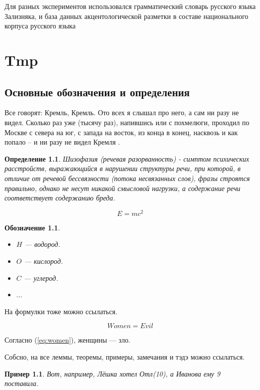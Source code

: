 \documentclass[14pt, a4paper, russian]{report}
\newtheorem{definition}{\indent Определение}
\newtheorem{example}{\indent Пример}
\newtheorem{notation}{\indent Обозначение}
\begin{document}
\begin{normalsize}
Для разных экспериментов использовался грамматический словарь русского языка Зализняка,\cite{zaliz} и база данных акцентологической разметки в составе национального корпуса русского языка\cite{grishina} 





\newpage
\chapter{Tmp}
\section{Основные обозначения и определения}

Все говорят: Кремль, Кремль. Ото всех я слышал про него, а сам ни разу не видел. Сколько раз уже (тысячу раз), напившись или с похмелюги, проходил по Москве с севера на юг, с запада на восток, из конца в конец, насквозь и как попало – и ни разу не видел Кремля \cite{erofeev}.

\begin{definition}\label{def:schizo}
Шизофазия (речевая разорванность) - симптом психических расстройств, выражающийся в нарушении структуры речи, при которой, в отличие от речевой бессвязности (потока несвязанных слов), фразы строятся правильно, однако не несут никакой смысловой нагрузки, а содержание речи соответствует содержанию бреда.\cite{schizo}
\end{definition}
$$E = m c^2$$

\begin{notation} 
\begin{itemize}
\item $H$ --- водород.
\item $O$ --- кислород.
\item $C$ --- углерод.
\item $\ldots$
\end{itemize}
\end{notation}

На формулки тоже можно ссылаться.

\begin{equation}\label{eq:women}
Women = Evil
\end{equation}

Согласно (\ref{eq:women}), женщины --- зло.

Собсно, на все леммы, теоремы, примеры, замечания и тэдэ можно ссылаться.

\begin{example}\label{ex:ivanova}
Вот, например, Лёшка хотел Отл(10), а Иванова ему 9 поставила.
\end{example}


\end{normalsize}
\end{document}
